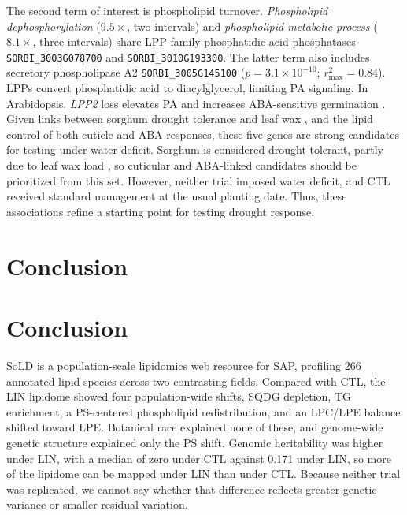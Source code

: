 \documentclass[9pt,twocolumn,twoside]{rilabRxiv}
\begin{document}
The second term of interest is phospholipid turnover. \textit{Phospholipid dephosphorylation} ($9.5\times$, two intervals) and \textit{phospholipid metabolic process} ($8.1\times$, three intervals) share LPP-family phosphatidic acid phosphatases \texttt{SORBI\_3003G078700} and \texttt{SORBI\_3010G193300}. The latter term also includes secretory phospholipase A2 \texttt{SORBI\_3005G145100} ($p = 3.1\times10^{-10}$; $r^2_{\max}=0.84$). LPPs convert phosphatidic acid to diacylglycerol, limiting PA signaling. In Arabidopsis, \textit{LPP2} loss elevates PA and increases ABA-sensitive germination \citep{Katagiri2005LPP2}. Given links between sorghum drought tolerance and leaf wax \citep{Busta2021, Fontanet2025SorghumDrought}, and the lipid control of both cuticle and ABA responses, these five genes are strong candidates for testing under water deficit. Sorghum is considered drought tolerant, partly due to leaf wax load \citep{Busta2021, Fontanet2025SorghumDrought}, so cuticular and ABA-linked candidates should be prioritized from this set. However, neither trial imposed water deficit, and CTL received standard management at the usual planting date. Thus, these associations refine a starting point for testing drought response.

\section*{Conclusion}

\section*{Conclusion}

SoLD is a population-scale lipidomics web resource for SAP, profiling 266 annotated lipid species across two contrasting fields. Compared with CTL, the LIN lipidome showed four population-wide shifts, SQDG depletion, TG enrichment, a PS-centered phospholipid redistribution, and an LPC/LPE balance shifted toward LPE. Botanical race explained none of these, and genome-wide genetic structure explained only the PS shift. Genomic heritability was higher under LIN, with a median of zero under CTL against 0.171 under LIN, so more of the lipidome can be mapped under LIN than under CTL. Because neither trial was replicated, we cannot say whether that difference reflects greater genetic variance or smaller residual variation.
\end{document}
